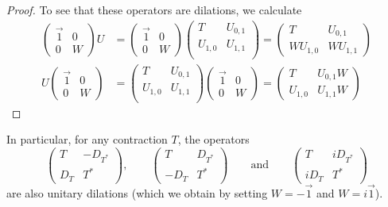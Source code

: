 \begin{proof}
To see that these operators are dilations, we calculate
\begin{align*}
\begin{pmatrix}
\vec{1} & 0 \\
0 & W
\end{pmatrix}U &= \begin{pmatrix}
\vec{1} & 0 \\
0 & W
\end{pmatrix}\begin{pmatrix}
T & U_{0,1} \\
U_{1,0} & U_{1,1} \\
\end{pmatrix} = \begin{pmatrix}
T & U_{0,1} \\
WU_{1,0} & WU_{1,1}
\end{pmatrix} \\
U\begin{pmatrix}
\vec{1} & 0 \\
0 & W
\end{pmatrix} &= \begin{pmatrix}
T & U_{0,1} \\
U_{1,0} & U_{1,1} \\
\end{pmatrix}\begin{pmatrix}
\vec{1} & 0 \\
0 & W
\end{pmatrix} = \begin{pmatrix}
T & U_{0,1}W \\
U_{1,0} & U_{1,1}W
\end{pmatrix}
\end{align*}
\end{proof}
In particular, for any contraction $T$, the operators
\[ \begin{pmatrix}
T & -D_{T^*} \\ D_T & T^*
\end{pmatrix}, \qquad \begin{pmatrix}
T & D_{T^*} \\ -D_T & T^*
\end{pmatrix} \qquad\text{and}\qquad \begin{pmatrix}
T & iD_{T^*} \\ iD_T & T^*
\end{pmatrix} \]
are also unitary dilations (which we obtain by setting $W = -\vec{1}$ and $W = i\vec{1}$).


